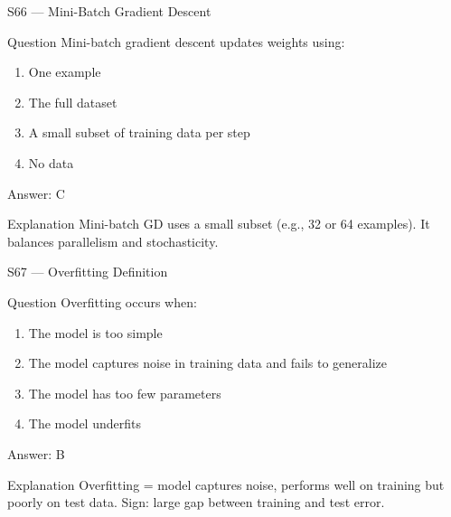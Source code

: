 \documentclass[aspectratio=169,8pt]{beamer}
\begin{document}
	\begin{frame}{S66 --- Mini-Batch Gradient Descent}
		\begin{block}{Question}
			Mini-batch gradient descent updates weights using:
			\begin{enumerate}
				\item One example
				\item The full dataset
				\item A small subset of training data per step
				\item No data
			\end{enumerate}
		\end{block}
		\begin{exampleblock}{Answer: C}\end{exampleblock}
		\begin{block}{Explanation}
			Mini-batch GD uses a small subset (e.g., 32 or 64 examples). It balances parallelism and stochasticity.
		\end{block}
	\end{frame}
	
	\begin{frame}{S67 --- Overfitting Definition}
		\begin{block}{Question}
			Overfitting occurs when:
			\begin{enumerate}
				\item The model is too simple
				\item The model captures noise in training data and fails to generalize
				\item The model has too few parameters
				\item The model underfits
			\end{enumerate}
		\end{block}
		\begin{exampleblock}{Answer: B}\end{exampleblock}
		\begin{block}{Explanation}
			Overfitting = model captures noise, performs well on training but poorly on test data. Sign: large gap between training and test error.
		\end{block}
	\end{frame}
	
\end{document}
